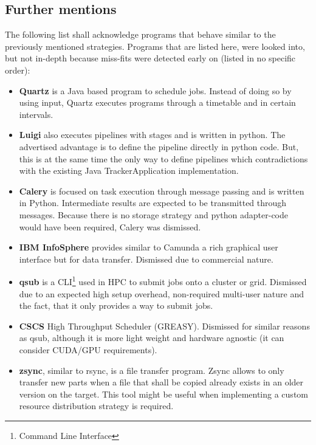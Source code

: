 \subsection{Further mentions}

The following list shall acknowledge programs that behave similar to the previously mentioned strategies.
Programs that are listed here, were looked into, but not in-depth because miss-fits were detected early on (listed in no specific order):

\begin{itemize}
	\item \textbf{Quartz}\cite{quartz:main} is a Java based program to schedule jobs. Instead of doing so by using input, Quartz executes programs through a timetable and in certain intervals.
	\item \textbf{Luigi}\cite{luigi:etc:distributed_pipelines} also executes pipelines with stages and is written in python. The advertised advantage is to define the pipeline directly in python code. But, this is at the same time the only way to define pipelines which contradictions with the existing Java TrackerApplication implementation.
	\item \textbf{Calery}\cite{celery:main} is focused on task execution through message passing and is written in Python. Intermediate results are expected to be transmitted through messages. Because there is no storage strategy and python adapter-code would have been required, Calery was dismissed.
	\item \textbf{IBM InfoSphere}\cite{infosphere:datastage} provides similar to Camunda a rich graphical user interface but for data transfer. Dismissed due to commercial nature.
	\item \textbf{qsub}\cite{qsub:etc:wiki}\cite{qsub:etc:uiowa} is a CLI\footnote{Command Line Interface} used in HPC to submit jobs onto a cluster or grid. Dismissed due to an expected high setup overhead, non-required multi-user nature and the fact, that it only provides a way to submit jobs.
	\item \textbf{CSCS}\cite{cscs:high_throughput} High Throughput Scheduler (GREASY). Dismissed for similar reasons as qsub, although it is more light weight and hardware agnostic (it can consider CUDA/GPU requirements).
	\item \textbf{zsync}\cite{zsync:main}, similar to rsync, is a file transfer program. Zsync allows to only transfer new parts when a file that shall be copied already exists in an older version on the target. This tool might be useful when implementing a custom resource distribution strategy is required.

\end{itemize}
